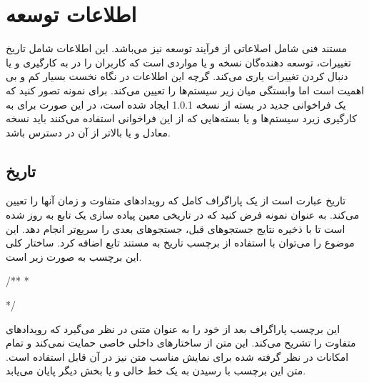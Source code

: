 %
% 
% 
% 
%
\section{اطلاعات توسعه}

مستند فنی شامل اصلاعاتی از فرآیند توسعه نیز می‌باشد. این اطلاعات شامل تاریخ
تغییرات، توسعه دهنده‌گان نسخه و یا مواردی است که کاربران را در به کارگیری و یا
دنبال کردن تغییرات یاری می‌کند.
گرچه این اطلاعات در نگاه نخست بسیار کم و بی اهمیت است اما وابستگی میان زیر
سیستم‌ها را تعیین می‌کند.
برای نمونه تصور کنید که یک فراخوانی جدید در بسته از نسخه 1.0.1 ایجاد شده است، در
این صورت برای به کارگیری زیرد سیستم‌ها و یا بسته‌هایی که از این فراخوانی استفاده
می‌کنند باید نسخه معادل و یا بالاتر از آن در دسترس باشد.

\subsection{تاریخ}

تاریخ عبارت است از یک پاراگراف کامل که رویدادهای متفاوت و زمان آنها را تعیین
می‌کند.
به عنوان نمونه فرض کنید که در تاریخی معین پیاده سازی یک تابع به روز شده است تا
با ذخیره نتایج جستجوهای قبل، جستجوهای بعدی را سریع‌تر انجام دهد.
این موضوع را می‌توان با استفاده از برچسب تاریخ به مستند تابع اضافه کرد.
ساختار کلی این برچسب به صورت زیر است.

\begin{C++}
/**
 * \date {date description}
 */
\end{C++}

این برچسب پاراگراف بعد از خود را به عنوان متنی در نظر می‌گیرد که رویدادهای
متفاوت را تشریح می‌کند.
این متن از ساختارهای داخلی خاصی حمایت نمی‌کند و تمام امکانات در نظر گرفته شده
برای نمایش مناسب متن نیز در آن قابل استفاده است.
متن این برچسب با رسیدن به یک خط خالی و یا بخش دیگر پایان می‌یابد.

